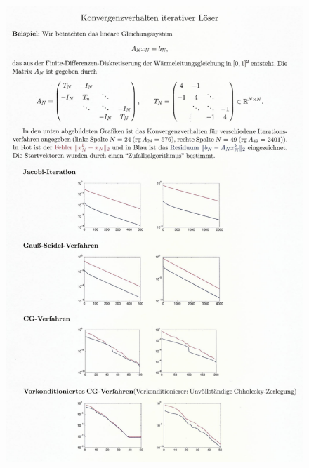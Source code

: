 \begin{figure}[htbp]
  \centering
  \includegraphics[width=\textwidth]{figures/konv_it_l.png}
\end{figure}













